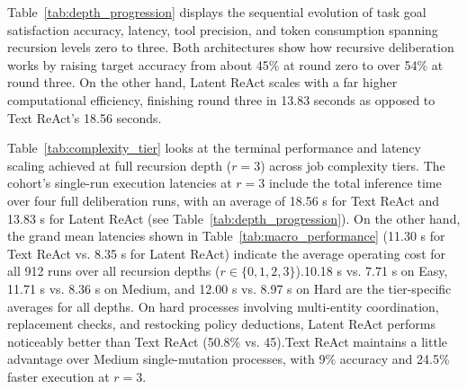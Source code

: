 \documentclass[a4paper, 12pt]{report}
\begin{document}
Table~\ref{tab:depth_progression} displays the sequential evolution of task goal satisfaction accuracy, latency, tool precision, and token consumption spanning recursion levels zero to three. Both architectures show how recursive deliberation works by raising target accuracy from about 45\% at round zero to over 54\% at round three. On the other hand, Latent ReAct scales with a far higher computational efficiency, finishing round three in 13.83 seconds as opposed to Text ReAct's 18.56 seconds.
\begin{table}[h!]
\centering
\small
\caption{Benchmark Evaluation Breakdown by Recursion Depth ($r = 0, 1, 2, 3$), with a mean continuous accuracy of goal satisfaction ($S_{\text{goal}} \times 100\%$).}
\label{tab:depth_progression}
\vspace{4pt}
\end{table}

Table~\ref{tab:complexity_tier} looks at the terminal performance and latency scaling achieved at full recursion depth ($r=3$) across job complexity tiers. The cohort's single-run execution latencies at $r=3$ include the total inference time over four full deliberation runs, with an average of 18.56 s for Text ReAct and 13.83 s for Latent ReAct (see Table~\ref{tab:depth_progression}). On the other hand, the grand mean latencies shown in Table~\ref{tab:macro_performance} (11.30 s for Text ReAct vs. 8.35 s for Latent ReAct) indicate the average operating cost for all 912 runs over all recursion depths ($r \in \{0, 1, 2, 3\}$).10.18 s vs. 7.71 s on Easy, 11.71 s vs. 8.36 s on Medium, and 12.00 s vs. 8.97 s on Hard are the tier-specific averages for all depths. On hard processes involving multi-entity coordination, replacement checks, and restocking policy deductions, Latent ReAct performs noticeably better than Text ReAct (50.8\% vs. 45).Text ReAct maintains a little advantage over Medium single-mutation processes, with 9\% accuracy and 24.5\% faster execution at $r=3$.
\end{document}
